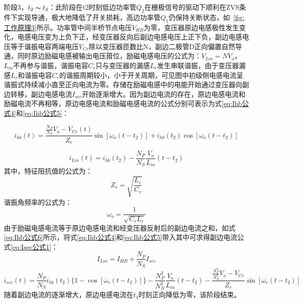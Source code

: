阶段3，$t_2 \thicksim t_3$：此阶段在t2时刻低边功率管$Q_2$在栅极信号的驱动下顺利在ZVS条件下实现导通，极大地降低了开关损耗，高边功率管$Q_1$仍保持关断状态，如~\ref{fig:工作原理3}所示。功率管中间半桥节点电压$V_{HB}$为零，变压器原边电感极性发生变化，电感电压变为上负下正，经变压器反向后副边电感电压上正下负，副边电感电压等于谐振电容两端电压$V_{Cr}$除以变压器匝数比N，副边二极管D正向偏置自然导通，同时原边励磁电感被输出电压箝位，励磁电感电压的公式为：$V_{Lm}=NV_o$，$L_m$不再参与谐振，谐振电容$C_r$只与变压器的漏感$L_r$发生串联谐振，由于变压器漏感$L_r$和谐振电容$C_r$的谐振周期较小，小于开关周期，可见图中初级侧电感电流呈谐振式持续减小直至正向电流为零。存储在励磁电感中的电能开始通过变压器向副边转移，副边电感电流$I_{sec}$开始逐渐增大。因为副边电流的存在，原边电感电流和励磁电流不再相等，原边电感电流和励磁电感电流的公式分别可表示为式\eqref{eq:Ihb公式4}和\eqref{eq:Ihb公式5}：

\begin{equation}
    \label{eq:Ihb公式4}
    i_{hb}(t) = \frac{\frac{N_P}{N_S}V_o - V_{Cr}(t)}{Z_r}\sin[\omega_o(t-t_2)] + i_{hb}(t_2) \cos[\omega_o(t-t_2)]  
\end{equation}

\begin{equation}
    \label{eq:Ihb公式5}
    i_{Lm}(t) = i_{hb}(t_2) - \frac{N_P}{N_S} \frac{V_o}{L_m}(t-t_2)
\end{equation}
其中，特征阻抗值的公式为：
\begin{equation}
    \label{eq:Zr公式}
    Z_r=\sqrt{\frac{L_r}{C_r}}  
\end{equation}
谐振角频率的公式为：
\begin{equation}
    \label{eq:omega_r公式}
    \omega_o=\frac{1}{\sqrt{C_r L_r}}
\end{equation}
由于励磁电感电流等于原边电感电流和经变压器反射后的副边电流之和，如式\eqref{eq:Ihb公式6}所示，将式\eqref{eq:Ihb公式4}和\eqref{eq:Ihb公式5}带入其中可求得副边电流公式\eqref{eq:Isec公式1}：
\begin{equation}
    \label{eq:Ihb公式6}
    I_{Lm} = I_{HB} + \frac{N_P}{N_S}I_{sec}
\end{equation}
\begin{equation}
    \label{eq:Isec公式1}
    i_{sec}(t) 
    = \frac{N_P}{N_S} i_{hb}(t_2) \{  1 - \cos[\omega_r(t-t_2)]\}  - \frac{N_P^2}{N_N^2} \frac{V_o}{L_m} (t-t_2)
    - \frac{\frac{N_P^2}{N_S^2} V_o - V_{Cr}}{Z_r} \sin[\omega_r(t-t_2)]
\end{equation}
随着副边电流的逐渐增大，原边电感电流在$t_3$时刻正向降低为零，该阶段结束。



